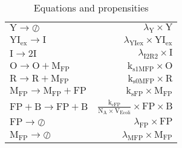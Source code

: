 \documentclass[11pt]{article}
\begin{document}
\begin{table}
\begin{tabular}{l|r}
        \\
            $ \text{Y} \rightarrow \oslash $
               &
            $ \lambda_{\text{Y}} \times \text{Y} $
        \\
            $ \text{YI}_{\text{ex}} \rightarrow \text{I} $
               &
            $ \lambda_{\text{YIex}} \times \text{YI}_{\text{ex}} $
        \\
            $ \text{I} \rightarrow 2\text{I} $
               &
            $ \lambda_{\text{I2R2}} \times \text{I} $
        \\
            $ \text{O} \rightarrow \text{O} + \text{M}_{\text{FP}} $
               &
            $ \text{k}_{\text{s1MFP}} \times \text{O} $
        \\
            $ \text{R} \rightarrow \text{R} + \text{M}_{\text{FP}} $
               &
            $ \text{k}_{\text{s0MFP}} \times \text{R} $
        \\
            $ \text{M}_{\text{FP}} \rightarrow \text{M}_{\text{FP}} + \text{FP} $
               &
            $ \text{k}_{\text{sFP}} \times \text{M}_{\text{FP}} $
        \\
            $ \text{FP} + \text{B} \rightarrow \text{FP} + \text{B} $
               &
            $ \frac{\text{k}_{\text{cFP}}}{\text{N}_{\text{A}} \times \text{V}_{\text{Ecoli}}}\times \text{FP} \times \text{B} $
        \\
            $ \text{FP} \rightarrow \oslash $
               &
            $ \lambda_{\text{FP}} \times \text{FP} $
        \\
            $ \text{M}_{\text{FP}} \rightarrow \oslash $
               &
            $ \lambda_{\text{MFP}} \times \text{M}_{\text{FP}} $
        \\
    \hline
    \end{tabular}
    \caption{Equations and propensities}
    \label{tab:equations}
\end{table}
\end{document}
